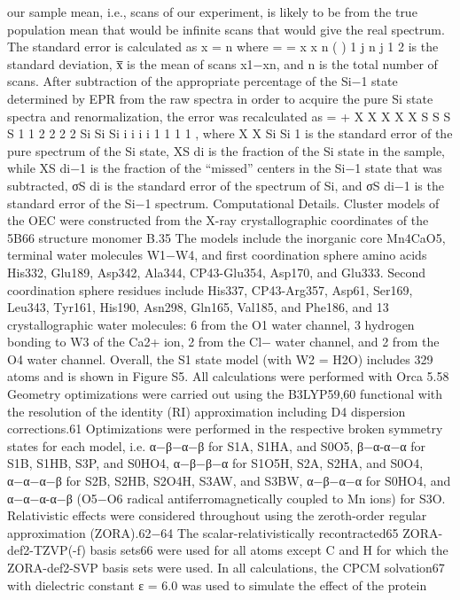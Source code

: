 \documentclass{article}
\begin{document}
our sample mean, i.e., scans of our experiment, is likely to be
from the true population mean that would be infinite scans
that would give the real spectrum. The standard error is
calculated as
x =
n where
=
= x
x
n
(
)
1
j
n
j
1
2
is the standard
deviation, x̅ is the mean of scans x1−xn, and n is the total
number of scans. After subtraction of the appropriate
percentage of the Si−1 state determined by EPR from the raw
spectra in order to acquire the pure Si state spectra and
renormalization,
the
error
was
recalculated
as
=
+
X
X
X
X
X
S
S
S
S
1
1
2
2
2
2
Si
Si
Si
i
i
i
i
1
1
1
1 , where
X
X
Si
Si
1 is
the standard error of the pure spectrum of the Si state, XS
di is the
fraction of the Si state in the sample, while XS
di−1 is the fraction
of the “missed” centers in the Si−1 state that was subtracted, σS
di
is the standard error of the spectrum of Si, and σS
di−1 is the
standard error of the Si−1 spectrum.
Computational Details. Cluster models of the OEC were
constructed from the X-ray crystallographic coordinates of the
5B66 structure monomer B.35 The models include the
inorganic core Mn4CaO5, terminal water molecules W1−W4,
and first coordination sphere amino acids His332, Glu189,
Asp342, Ala344, CP43-Glu354, Asp170, and Glu333. Second
coordination sphere residues include His337, CP43-Arg357,
Asp61, Ser169, Leu343, Tyr161, His190, Asn298, Gln165,
Val185, and Phe186, and 13 crystallographic water molecules:
6 from the O1 water channel, 3 hydrogen bonding to W3 of
the Ca2+ ion, 2 from the Cl− water channel, and 2 from the O4
water channel. Overall, the S1 state model (with W2 = H2O)
includes 329 atoms and is shown in Figure S5.
All calculations were performed with Orca 5.58 Geometry
optimizations were carried out using the B3LYP59,60 functional
with the resolution of the identity (RI) approximation
including D4 dispersion corrections.61 Optimizations were
performed in the respective broken symmetry states for each
model, i.e. α−β−α−β for S1A, S1HA, and S0O5, β−α-α−α for
S1B, S1HB, S3P, and S0HO4, α−β−β−α for S1O5H, S2A,
S2HA, and S0O4, α−α−α−β for S2B, S2HB, S2O4H, S3AW,
and S3BW, α−β−α−α for S0HO4, and α−α−α-α−β (O5−O6
radical antiferromagnetically coupled to Mn ions) for S3O.
Relativistic effects were considered throughout using the
zeroth-order regular approximation (ZORA).62−64 The
scalar-relativistically recontracted65 ZORA-def2-TZVP(-f)
basis sets66 were used for all atoms except C and H for
which the ZORA-def2-SVP basis sets were used. In all
calculations, the CPCM solvation67 with dielectric constant ε
= 6.0 was used to simulate the effect of the protein
\end{document}
